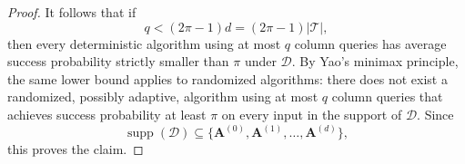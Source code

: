 \documentclass[10pt,a4paper]{amsart}
\begin{document}
\begin{proof}
    It follows that if
    \begin{equation}
        q < (2\pi-1)d
        =
        (2\pi-1)|\mathcal{T}|,
    \end{equation}
    then every deterministic algorithm using at most $q$ column queries has
    average success probability strictly smaller than $\pi$ under
    $\mathcal{D}$. By Yao's minimax principle, the same lower bound applies to
    randomized algorithms: there does not exist a randomized, possibly adaptive,
    algorithm using at most $q$ column queries that achieves success probability
    at least $\pi$ on every input in the support of $\mathcal{D}$. Since
    $$
        \operatorname{supp}(\mathcal{D})
        \subseteq
        \{
        \mathbf{A}^{(0)},\mathbf{A}^{(1)},\ldots,\mathbf{A}^{(d)}
        \},
    $$
    this proves the claim.
\end{proof}
\end{document}
